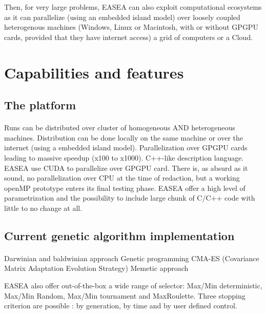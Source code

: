 \documentclass{article}
\begin{document}
Then, for very large problems, EASEA can also exploit computational ecosystems as it can parallelize (using an embedded island model) over loosely coupled heterogenous machines (Windows, Linux or Macintosh, with or without GPGPU cards, provided that they have internet access) a grid of computers or a Cloud.

\section{Capabilities and features} %
\label{sec:Capabilities}

  \subsection{The platform} %
  \label{sub:subsection name}
  \paragraph{} %
  \label{par:}
  
    Runs can be distributed over cluster of homogeneous AND heterogeneous machines.
    Distribution can be done locally on the same machine or over the internet (using a embedded island model).
    Parallelization over GPGPU cards leading to massive speedup (x100 to x1000).
    C++-like description language.
  EASEA use CUDA to parallelize over GPGPU card. There is, as absurd as it sound, no
  parallelization over CPU at the time of redaction, but a working openMP prototype
  enters its final testing phase.
  EASEA offer a high level of parametrization and the possibility to include large
  chunk of C/C++ code with little to no change at all.
    \subsection{Current genetic algorithm implementation} %
    \label{sub:current genetic algorithm implementation}
    \paragraph{} %
    \label{par:}
    Darwinian and baldwinian approach
    Genetic programming
    CMA-ES (Covariance Matrix Adaptation Evolution Strategy)
    Memetic approach 

    EASEA also offer out-of-the-box a wide range of selector: Max/Min deterministic,
    Max/Min Random, Max/Min tournament and MaxRoulette.
    Three stopping criterion are possible : by generation, by time and by user
    defined control.
\end{document}

